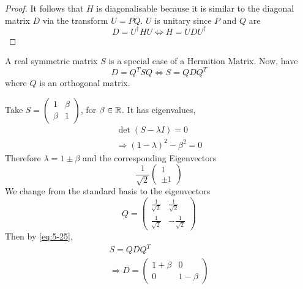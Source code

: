 \documentclass{article}
\numberwithin{equation}{section}
\begin{document}
\begin{proof}
    It follows that $H$ is diagonalisable because it is similar to the diagonal matrix $D$ via the transform $U = PQ$.
    $U$ is unitary since $P$ and $Q$ are
    \begin{equation}\label{eq:5-24}
        D = U^\dagger H U \Leftrightarrow H = U D U^\dagger
    \end{equation}
\end{proof}
\begin{remark}
    A real symmetric matrix $S$ is a special case of a Hermition Matrix.
    Now, have
    \begin{equation}\label{eq:5-25}
        D = Q^T S Q \Leftrightarrow S = Q D Q^T
    \end{equation}
    where $Q$ is an orthogonal matrix.
\end{remark}

\begin{eg}
    Take $S = \begin{pmatrix}
        1 & \beta \\
        \beta & 1
    \end{pmatrix}$, for $\beta \in \mathbb{R}$. It has eigenvalues,
    \begin{align*}
        \det(S - \lambda I) = 0 \\
        \Rightarrow (1 - \lambda)^2 - \beta^2 = 0
    \end{align*}
    Therefore $\lambda = 1 \pm \beta$ and the corresponding Eigenvectors
    \[
        \frac{1}{\sqrt{2}}\begin{pmatrix}
            1 \\ \pm 1
        \end{pmatrix}  
    \]
    We change from the standard basis to the eigenvectors
    \[
        Q = \begin{pmatrix}
            \frac{1}{\sqrt{2}} & \frac{1}{\sqrt{2}} \\
            \frac{1}{\sqrt{2}} & - \frac{1}{\sqrt{2}}
        \end{pmatrix}
    \]
    Then by \eqref{eq:5-25},
    \begin{align*}
        S = Q D Q^T \\
        \Rightarrow D = \begin{pmatrix}
            1 + \beta & 0 \\
            0 & 1 - \beta
        \end{pmatrix}
    \end{align*}
\end{eg}
\end{document}
